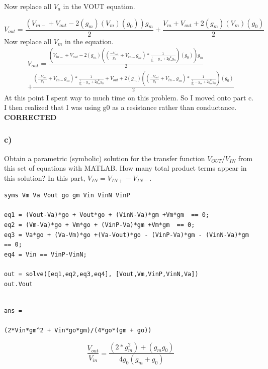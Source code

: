 \documentclass[10pt,a4paper]{article}
\begin{document}
Now replace all $V_a$ in the VOUT equation.

\begin{equation}
V_{out} = \frac{(V_{in-} + V_{out} - 2(g_m)(V_m)(g_0))g_m}{2} +  \frac{V_m + V_{out} + 2(g_m)(V_m)(g_0)}{2}
\end{equation}
Now replace all $V_m$ in the  equation.
\begin{multline}
V_{out} = \frac{(V_{in-} + V_{out} - 2(g_m)((\frac{-V_{out}}{g_0} + V_{in-}g_m) * \frac{1}{\frac{1}{g_0} - g_m + 2g_m^2g_0})(g_0))g_m}{2}\\ +  \frac{(\frac{-V_{out}}{g_0} + V_{in-}g_m) * \frac{1}{\frac{1}{g_0} - g_m + 2g_m^2g_0} + V_{out} + 2(g_m)((\frac{-V_{out}}{g_0} + V_{in-}g_m) * \frac{1}{\frac{1}{g_0} - g_m + 2g_m^2g_0})(g_0)}{2}
\end{multline}
At this point I spent way to much time on this problem. So I moved onto part c. I then realized that I was using g0 as a resistance rather than conductance.\\
\textbf{CORRECTED}\\



\subsubsection*{c)}
Obtain a parametric (symbolic) solution for the transfer function \(V_{OUT}/V_{IN}\)
from this set of equations with MATLAB. How many total product terms appear in this
solution? In this part, \(V_{IN} = V_{IN+} - V_{IN-}\).\\

\begin{lstlisting}
syms Vm Va Vout go gm Vin VinN VinP

eq1 = (Vout-Va)*go + Vout*go + (VinN-Va)*gm +Vm*gm  == 0;
eq2 = (Vm-Va)*go + Vm*go + (VinP-Va)*gm +Vm*gm  == 0;
eq3 = Va*go + (Va-Vm)*go +(Va-Vout)*go - (VinP-Va)*gm - (VinN-Va)*gm == 0;
eq4 = Vin == VinP-VinN;

out = solve([eq1,eq2,eq3,eq4], [Vout,Vm,VinP,VinN,Va])
out.Vout

\end{lstlisting}
\begin{lstlisting}

ans =
 
(2*Vin*gm^2 + Vin*go*gm)/(4*go*(gm + go))\end{lstlisting}


\begin{equation}
\frac{V_{out}}{V_{in}} = \frac{(2 * g_m^2) + (g_m g_0) }{4 g_0 (g_m + g_0)}
\end{equation}
\end{document}
